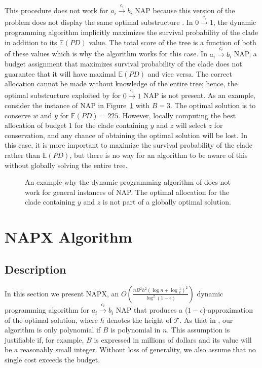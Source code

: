 \documentclass[10pt]{llncs}       \usepackage{graphicx,subfigure}
\begin{document}
This procedure 
does not work for $a_i \xrightarrow{c_i} b_i$
NAP because this version of the 
problem does not display the same optimal substructure \cite{pardi07}.  In 
$0 \xrightarrow{c_i} 1$, the dynamic programming algorithm implicitly
maximizes the survival probability of the clade in addition to its
$\mathbb{E}(PD)$ value.  The total score of the tree is a function of
both of these values which is why the algorithm works for this case.
In $a_i \xrightarrow{c_i} b_i$ NAP, a budget assignment that maximizes
survival probability of the clade does not guarantee that it will
have maximal $\mathbb{E}(PD)$ and vice versa. The correct allocation cannot
be made without knowledge of the entire tree; hence, the optimal
substructure exploited by \cite{pardi07} for $0 \xrightarrow{c_i} 1$ NAP
is not present. As an example, consider the instance of NAP in 
Figure~\ref{fig:counter} with $B=3$.  The optimal solution is to conserve
$w$ and $y$ for $\mathbb{E}(PD)=225$. However, locally computing the best 
allocation of budget $1$ for the clade containing $y$ and $z$ will select
$z$ for conservation, and any chance of obtaining the optimal solution will
be lost.  In this case, it is more important to maximize the 
survival probability
of the clade rather than $\mathbb{E}(PD)$, but there is no way for an
algorithm to be aware of this without globally solving the entire tree.  

\begin{figure}{
     \begin{center}\leavevmode
     \end{center}
  }
  \caption{An example why the dynamic programming algorithm of \cite{pardi07}
does not work for general instances of NAP.  The optimal allocation for the
clade containing $y$ and $z$ is not part of a globally optimal solution.}
  \label{fig:counter}
\end{figure}

\section{NAPX Algorithm}
\label{sec:ptas}

\subsection{Description}

In this section we present NAPX, an 
$O\left(\frac{nB^2h^2\left(\log{n} + \log{\frac{1}{\epsilon}}\right)^2}
{\log^2(1-\epsilon)}\right)$ 
dynamic programming algorithm for  $a_i \xrightarrow{c_i} b_i$
NAP that produces a ($1 - \epsilon$)-approximation of the optimal 
solution, where $h$ denotes the height of 
$\mathcal{T}$. As that in \cite{pardi07},
our algorithm is only polynomial if $B$ is polynomial in $n$.
  This assumption is justifiable if, for example,
$B$ is expressed in millions of dollars and its value will be a reasonably
small integer.  Without loss of generality, we also assume that no single
cost exceeds the budget.  
\end{document}
